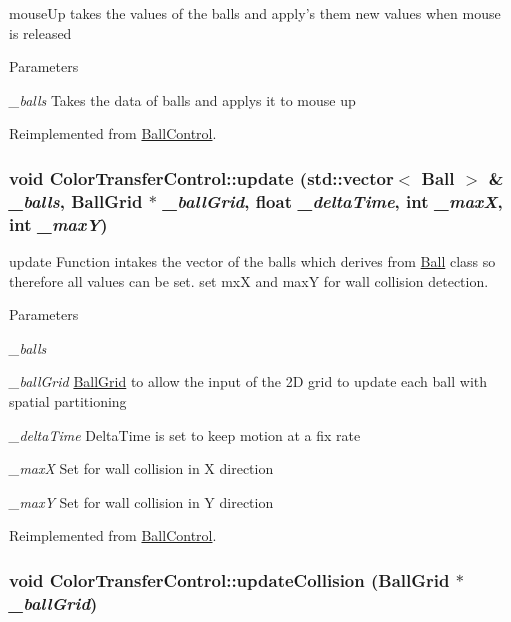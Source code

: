 mouseUp takes the values of the balls and apply's them new values when mouse is released 
\begin{DoxyParams}{Parameters}
\item[{\em \_\-balls}]Takes the data of balls and applys it to mouse up \end{DoxyParams}


Reimplemented from \hyperlink{classBallControl_adbc3a6859b147973570a0a531942e595}{BallControl}.\hypertarget{classColorTransferControl_add37c8ee8e911a13ecec98cf09fc81c4}{
\subsubsection[{update}]{\setlength{\rightskip}{0pt plus 5cm}void ColorTransferControl::update (std::vector$<$ {\bf Ball} $>$ \& {\em \_\-balls}, \/  {\bf BallGrid} $\ast$ {\em \_\-ballGrid}, \/  float {\em \_\-deltaTime}, \/  int {\em \_\-maxX}, \/  int {\em \_\-maxY})}}
\label{classColorTransferControl_add37c8ee8e911a13ecec98cf09fc81c4}


update Function intakes the vector of the balls which derives from \hyperlink{structBall}{Ball} class so therefore all values can be set. set mxX and maxY for wall collision detection. 
\begin{DoxyParams}{Parameters}
\item[{\em \_\-balls}]\item[{\em \_\-ballGrid}]\hyperlink{classBallGrid}{BallGrid} to allow the input of the 2D grid to update each ball with spatial partitioning \item[{\em \_\-deltaTime}]DeltaTime is set to keep motion at a fix rate \item[{\em \_\-maxX}]Set for wall collision in X direction \item[{\em \_\-maxY}]Set for wall collision in Y direction \end{DoxyParams}


Reimplemented from \hyperlink{classBallControl_af32a9b232b26af69231966ae3aab98d5}{BallControl}.\hypertarget{classColorTransferControl_a9f54f20a18940cf66c08a994eb8dfb01}{
\subsubsection[{updateCollision}]{\setlength{\rightskip}{0pt plus 5cm}void ColorTransferControl::updateCollision ({\bf BallGrid} $\ast$ {\em \_\-ballGrid})}}
\label{classColorTransferControl_a9f54f20a18940cf66c08a994eb8dfb01}


